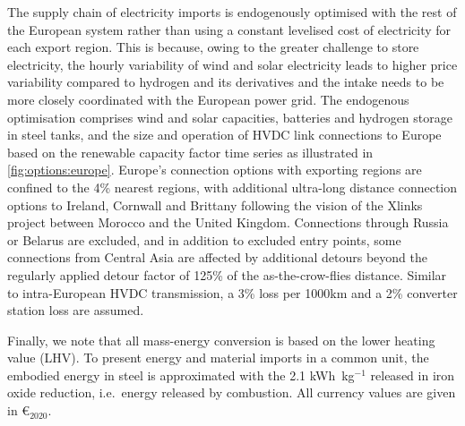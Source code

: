 The supply chain of electricity imports is endogenously optimised with the rest
of the European system rather than using a constant levelised cost of
electricity for each export region. This is because, owing to the greater
challenge to store electricity, the hourly variability of wind and solar
electricity leads to higher price variability compared to hydrogen and its
derivatives and the intake needs to be more closely coordinated with the
European power grid. The endogenous optimisation comprises wind and solar
capacities, batteries and hydrogen storage in steel tanks, and the size and
operation of HVDC link connections to Europe based on the renewable capacity
factor time series as illustrated in \cref{fig:options:europe}. Europe's
connection options with exporting regions are confined to the 4\% nearest
regions, with additional ultra-long distance connection options to Ireland,
Cornwall and Brittany following the vision of the Xlinks project between Morocco
and the United Kingdom.\cite{xlinksMoroccoUKPower2023} Connections through
Russia or Belarus are excluded, and in addition to excluded entry points, some
connections from Central Asia are affected by additional detours beyond the
regularly applied detour factor of 125\% of the as-the-crow-flies distance.
Similar to intra-European HVDC transmission, a 3\% loss per 1000km and a 2\%
converter station loss are assumed.

\vspace{1em}

Finally, we note that all mass-energy conversion is based on the lower heating
value (LHV). To present energy and material imports in a common unit, the
embodied energy in steel is approximated with the 2.1 kWh~kg$^{-1}$ released in
iron oxide reduction, i.e.~energy released by
combustion.\cite{kuhnIronRecyclable2022} All currency values are given in
\euro{}$_{2020}$.
